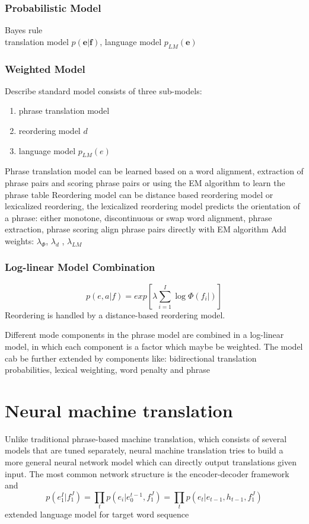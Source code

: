 \subsubsection{Probabilistic Model}
Bayes rule \\
translation model ${p(\bm{e}| \bm{f})}$, language model ${p_{LM}(\bm{e})}$

\subsubsection{Weighted Model}
Describe standard model consists of three sub-models:
\begin{enumerate}
\item phrase translation model 
\item reordering model ${d}$
\item language model ${p_{LM}(e)}$
\end{enumerate}
Phrase translation model can be learned based on a  word alignment, extraction of phrase pairs and scoring phrase pairs or using the EM algorithm to learn the phrase table
Reordering model can be distance based reordering model or lexicalized reordering, the lexicalized reordering model predicts the orientation of a phrase: either monotone, discontinuous or swap word alignment, phrase extraction, phrase scoring align phrase pairs directly with EM algorithm
Add weights: ${\lambda_{\Phi}}$, ${\lambda_{d}}$ , ${\lambda_{LM}}$


\subsubsection{ Log-linear Model Combination}
\[p(e, a | f) =exp[\lambda \sum_{i=1}^{I} \log \Phi(f_i|)] \]
Reordering is handled by a distance-based reordering model.

Different mode components in the phrase model are combined in a log-linear model, in which each component is a factor which maybe be weighted. The model cab be further extended by components like: bidirectional translation probabilities, lexical weighting, word penalty and phrase
\section{Neural machine translation}
Unlike traditional phrase-based machine translation, which consists of several models that are tuned separately, neural machine translation tries to build a more general neural network model which can directly output translations given input.
The most common network structure is the encoder-decoder framework and 
\[ p(e_1^I | f_1^J) = \prod_{t} p(e_i|e_0^{t-1}, f_1^J) = \prod_{t} {p(e_t| e_{t-1}, h_{t-1}, f_1^J)} \] 
extended language model for target word sequence

